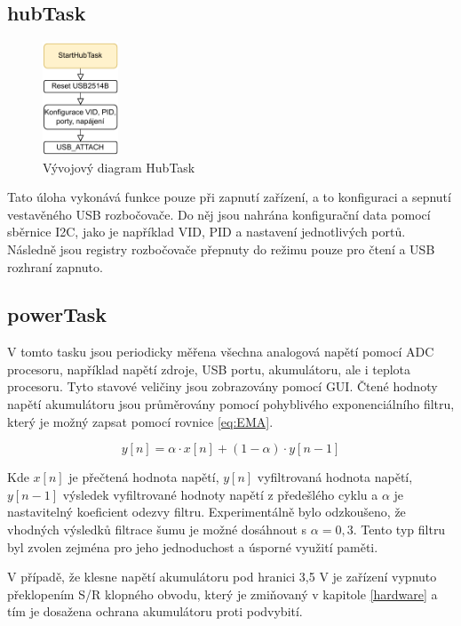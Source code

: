 \subsection{hubTask}
\begin{figure}[h]
    \centering
    \includegraphics[width=0.2\textwidth]{obrazky/HubTask}
    \caption{Vývojový diagram HubTask}
\end{figure}
Tato úloha vykonává funkce pouze při zapnutí zařízení, a to konfiguraci a sepnutí vestavěného \ac{USB} rozbočovače. Do něj jsou nahrána konfigurační data pomocí sběrnice I2C, jako je například \ac{VID}, \ac{PID} a nastavení jednotlivých portů. Následně jsou registry rozbočovače přepnuty do režimu pouze pro čtení a \ac{USB} rozhraní zapnuto.
\subsection{powerTask}
V tomto tasku jsou periodicky měřena všechna analogová napětí pomocí \ac{ADC} procesoru, například napětí zdroje, USB portu, akumulátoru, ale i teplota procesoru. Tyto stavové veličiny jsou zobrazovány pomocí \ac{GUI}. Čtené hodnoty napětí akumulátoru jsou průměrovány pomocí pohyblivého exponenciálního filtru, který je možný zapsat pomocí rovnice \ref{eq:EMA}.

\begin{equation} \label{eq:EMA}
y[n]=\alpha \cdot x[n] + (1-\alpha)\cdot y[n-1]
\end{equation}

Kde $ x[n] $ je přečtená hodnota napětí, $ y[n] $ vyfiltrovaná hodnota napětí, $ y[n-1] $ výsledek vyfiltrované hodnoty napětí z předešlého cyklu a $ \alpha $ je nastavitelný koeficient odezvy filtru. Experimentálně bylo odzkoušeno, že vhodných výsledků filtrace šumu je možné dosáhnout s $ \alpha = 0,3$. Tento typ filtru byl zvolen zejména pro jeho jednoduchost a úsporné využití paměti.

V případě, že klesne napětí akumulátoru pod hranici 3,5 V je zařízení vypnuto překlopením S/R klopného obvodu, který je zmiňovaný v kapitole \ref{hardware} a tím je dosažena ochrana akumulátoru proti podvybití.


